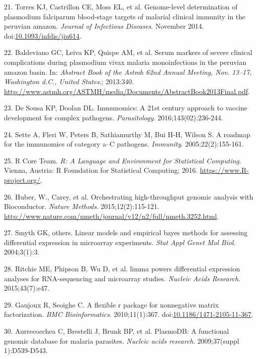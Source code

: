 \documentclass[]{article}
\begin{document}
\hypertarget{ref-Torres2014asymptomatic}{}
21. Torres KJ, Castrillon CE, Moss EL, et al. Genome-level determination
of plasmodium falciparum blood-stage targets of malarial clinical
immunity in the peruvian amazon. \emph{Journal of Infectious Diseases}.
November 2014.
doi:\href{https://doi.org/10.1093/infdis/jiu614}{10.1093/infdis/jiu614}.

\hypertarget{ref-baldevi2013}{}
22. Baldeviano GC, Leiva KP, Quispe AM, et al. Serum markers of severe
clinical complications during plasmodium vivax malaria monoinfections in
the peruvian amazon basin. In: \emph{Abstract Book of the Astmh 62nd
Annual Meeting, Nov. 13--17, Washington d.C., United States}.; 2013:340.
\url{http://www.astmh.org/ASTMH/media/Documents/AbstractBook2013Final.pdf}.

\hypertarget{ref-immunomics2016}{}
23. De Sousa KP, Doolan DL. Immunomics: A 21st century approach to
vaccine development for complex pathogens. \emph{Parasitology}.
2016;143(02):236-244.

\hypertarget{ref-sette2005}{}
24. Sette A, Fleri W, Peters B, Sathiamurthy M, Bui H-H, Wilson S. A
roadmap for the immunomics of category a--C pathogens. \emph{Immunity}.
2005;22(2):155-161.

\hypertarget{ref-R}{}
25. R Core Team. \emph{R: A Language and Environment for Statistical
Computing}. Vienna, Austria: R Foundation for Statistical Computing;
2016. \url{https://www.R-project.org/}.

\hypertarget{ref-Biobase}{}
26. Huber, W., Carey, et al. Orchestrating high-throughput genomic
analysis with Bioconductor. \emph{Nature Methods}. 2015;12(2):115-121.
\url{http://www.nature.com/nmeth/journal/v12/n2/full/nmeth.3252.html}.

\hypertarget{ref-smyth2004ebayes}{}
27. Smyth GK, others. Linear models and empirical bayes methods for
assessing differential expression in microarray experiments. \emph{Stat
Appl Genet Mol Biol}. 2004;3(1):3.

\hypertarget{ref-limma}{}
28. Ritchie ME, Phipson B, Wu D, et al. limma powers differential
expression analyses for RNA-sequencing and microarray studies.
\emph{Nucleic Acids Research}. 2015;43(7):e47.

\hypertarget{ref-Gaujoux2010NMF}{}
29. Gaujoux R, Seoighe C. A flexible r package for nonnegative matrix
factorization. \emph{BMC Bioinformatics}. 2010;11(1):367.
doi:\href{https://doi.org/10.1186/1471-2105-11-367}{10.1186/1471-2105-11-367}.

\hypertarget{ref-plasmodb}{}
30. Aurrecoechea C, Brestelli J, Brunk BP, et al. PlasmoDB: A functional
genomic database for malaria parasites. \emph{Nucleic acids research}.
2009;37(suppl 1):D539-D543.
\end{document}

